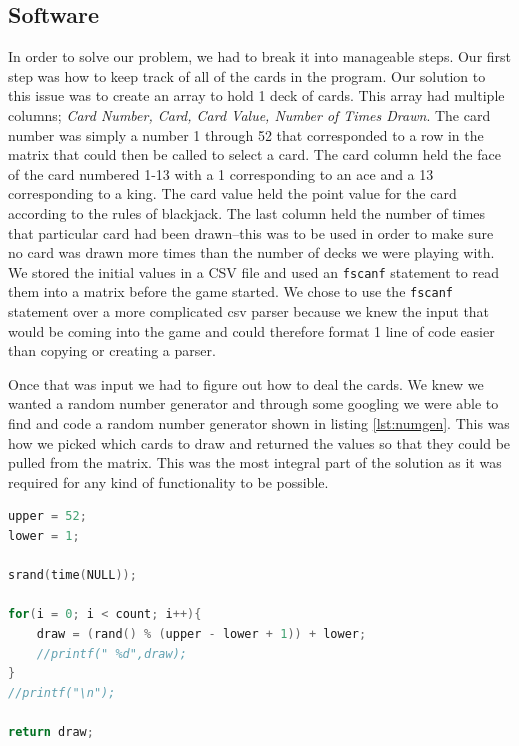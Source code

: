 \documentclass[12pt]{article}
\begin{document}
\subsection{Software}
In order to solve our problem, we had to break it into manageable steps. Our first step was how to keep track of all of the cards in the program. Our solution to this issue was to create an array to hold 1 deck of cards. This array had multiple columns; \emph{Card Number, Card, Card Value, Number of Times Drawn}. The card number was simply a number 1 through 52 that corresponded to a row in the matrix that could then be called to select a card. The card column held the face of the card numbered 1-13 with a 1 corresponding to an ace and a 13 corresponding to a king. The card value held the point value for the card according to the rules of blackjack. The last column held the number of times that particular card had been drawn--this was to be used in order to make sure no card was drawn more times than the number of decks we were playing with. We stored the initial values in a CSV file and used an \texttt{fscanf} statement to read them into a matrix before the game started. We chose to use the \texttt{fscanf} statement over a more complicated csv parser because we knew the input that would be coming into the game and could therefore format 1 line of code easier than copying or creating a parser.

Once that was input we had to figure out how to deal the cards. We knew we wanted a random number generator \cite{numgen} and through some googling we were able to find and code a random number generator shown in listing \ref{lst:numgen}. This was how we picked which cards to draw and returned the values so that they could be pulled from the matrix. This was the most integral part of the solution as it was required for any kind of functionality to be possible.

\begin{lstlisting}[language = C, caption = Random Number Generator, label = {lst:numgen}]
upper = 52;
lower = 1;

srand(time(NULL));

for(i = 0; i < count; i++){
    draw = (rand() % (upper - lower + 1)) + lower;
    //printf(" %d",draw);
}
//printf("\n");

return draw;
\end{lstlisting}
\end{document}
